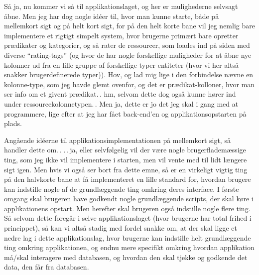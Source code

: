 \documentclass{report}
\begin{document}
Så ja, nu kommer vi så til applikationslaget, og her er mulighederne selvsagt åbne. Men jeg har dog nogle idéer til, hvor man kunne starte, både på mellemkort sigt og på helt kort sigt, for på den helt korte bane vil jeg nemlig bare implementere et rigtigt simpelt system, hvor brugerne primært bare opretter prædikater og kategorier, og så rater de ressourcer, som loades ind på siden med diverse ``rating-tags'' (og hvor de har nogle forskellige muligheder for at åbne nye kolonner ud fra en lille gruppe af forskellige typer entiteter (hvor vi her altså snakker brugerdefinerede typer)). Hov, og lad mig lige i den forbindelse nævne en kolonne-type, som jeg havde glemt ovenfor, og det er prædikat-kolloner, hvor man ser info om et givent prædikat.\,. hm, selvom dette dog også kunne hører ind under ressourcekolonnetypen.\,. Men ja, dette er jo det jeg skal i gang med at programmere, lige efter at jeg har fået back-end'en og applikationsopstarten på plads.

Angående idéerne til applikationsimplementationen på mellemkort sigt, så handler dette om.\,. .\,.\,ja, eller selvfølgelig vil der være nogle brugerflademæssige ting, som jeg ikke vil implementere i starten, men vil vente med til lidt længere sigt igen. Men hvis vi også ser bort fra dette emne, så er en virkeligt vigtig ting på den halvkorte bane at få implementeret en lille standard for, hvordan brugere kan indstille nogle af de grundlæggende ting omkring deres interface. I første omgang skal brugeren have godkendt nogle grundlæggende scripts, der skal køre i applikationens opstart. Men herefter skal brugeren også indstille nogle flere ting. Så selvom dette foregår i selve applikationslaget (hvor brugerne har total frihed i princippet), så kan vi altså stadig med fordel snakke om, at der skal ligge et nedre lag i dette applikationslag, hvor brugerne kan indstille helt grundlæggende ting omkring applikationen, og endnu mere specifikt omkring hvordan applikation må/skal interagere med databasen, og hvordan den skal tjekke og godkende det data, den får fra databasen.
\end{document}
